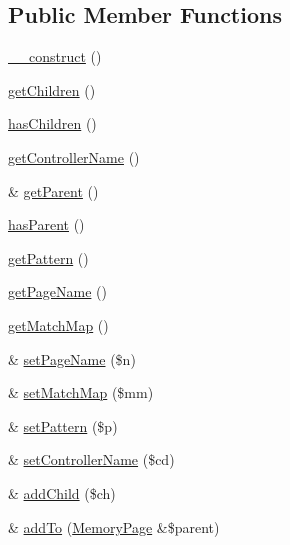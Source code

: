 \subsection*{Public Member Functions}
\begin{DoxyCompactItemize}
\item 
\hyperlink{classWEPPO_1_1Routing_1_1MemoryPage_adf1b6ee0e4d2ae30ccbe20c8cc4a3184}{\+\_\+\+\_\+construct} ()
\item 
\hyperlink{classWEPPO_1_1Routing_1_1MemoryPage_ad726c106cab63732524dcbdfbc8a508b}{get\+Children} ()
\item 
\hyperlink{classWEPPO_1_1Routing_1_1MemoryPage_a11b3eaaa0019c73a70c46c8c87af88f8}{has\+Children} ()
\item 
\hyperlink{classWEPPO_1_1Routing_1_1MemoryPage_ad5dc3c37e2143b060fc729fd02010def}{get\+Controller\+Name} ()
\item 
\& \hyperlink{classWEPPO_1_1Routing_1_1MemoryPage_a8502933faf15ac2c53aaccb7dc55ee42}{get\+Parent} ()
\item 
\hyperlink{classWEPPO_1_1Routing_1_1MemoryPage_af13beb2a9167aa4d43818e32a2c1c237}{has\+Parent} ()
\item 
\hyperlink{classWEPPO_1_1Routing_1_1MemoryPage_a8c159548b29eb3236a04cfc1f44f9520}{get\+Pattern} ()
\item 
\hyperlink{classWEPPO_1_1Routing_1_1MemoryPage_a0a214ea3615b601cb82f2f1684c9a936}{get\+Page\+Name} ()
\item 
\hyperlink{classWEPPO_1_1Routing_1_1MemoryPage_a178f40dfd661cabfe3caf9b175709f7f}{get\+Match\+Map} ()
\item 
\& \hyperlink{classWEPPO_1_1Routing_1_1MemoryPage_a467ffea2abb62daf2ef5d12dc78643a2}{set\+Page\+Name} (\$n)
\item 
\& \hyperlink{classWEPPO_1_1Routing_1_1MemoryPage_a96eb1b80c9b6b27eae27636eb87a2e3f}{set\+Match\+Map} (\$mm)
\item 
\& \hyperlink{classWEPPO_1_1Routing_1_1MemoryPage_a4776aaa75bfde4d047244d823aae9b48}{set\+Pattern} (\$p)
\item 
\& \hyperlink{classWEPPO_1_1Routing_1_1MemoryPage_a72c7c032bfbb88bc0d3c685a0f28a02f}{set\+Controller\+Name} (\$cd)
\item 
\& \hyperlink{classWEPPO_1_1Routing_1_1MemoryPage_a5d5f8d18bb4383cf53734ef1089af396}{add\+Child} (\$ch)
\item 
\& \hyperlink{classWEPPO_1_1Routing_1_1MemoryPage_ab0888bdc5189c33ed65a90518a30eeb3}{add\+To} (\hyperlink{classWEPPO_1_1Routing_1_1MemoryPage}{Memory\+Page} \&\$parent)
\end{DoxyCompactItemize}
